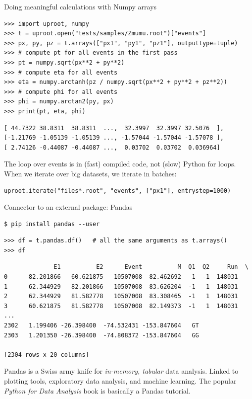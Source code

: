\documentclass[aspectratio=169]{beamer}
\begin{document}
\begin{frame}[fragile]{Doing meaningful calculations with Numpy arrays}
\small
\begin{verbatim}
>>> import uproot, numpy
>>> t = uproot.open("tests/samples/Zmumu.root")["events"]
>>> px, py, pz = t.arrays(["px1", "py1", "pz1"], outputtype=tuple)
>>> # compute pt for all events in the first pass
>>> pt = numpy.sqrt(px**2 + py**2)
>>> # compute eta for all events
>>> eta = numpy.arctanh(pz / numpy.sqrt(px**2 + py**2 + pz**2))
>>> # compute phi for all events
>>> phi = numpy.arctan2(py, px)
>>> print(pt, eta, phi)
\end{verbatim}
\begin{verbatim}
[ 44.7322 38.8311  38.8311  ...,  32.3997  32.3997 32.5076  ],
[-1.21769 -1.05139 -1.05139 ..., -1.57044 -1.57044 -1.57078 ],
[ 2.74126 -0.44087 -0.44087 ...,  0.03702  0.03702  0.036964]
\end{verbatim}

\normalsize
The loop over events is in (fast) compiled code, not (slow) Python for loops. When we iterate over big datasets, we iterate in batches:

\small
\begin{verbatim}
uproot.iterate("files*.root", "events", ["px1"], entrystep=1000)
\end{verbatim}
\end{frame}

\begin{frame}[fragile]{Connector to an external package: Pandas}
\vspace{0.1 cm}
\small
\begin{verbatim}
$ pip install pandas --user
\end{verbatim}
\begin{verbatim}
>>> df = t.pandas.df()   # all the same arguments as t.arrays()
>>> df
\end{verbatim}
\begin{verbatim}
              E1          E2      Event          M  Q1  Q2     Run  \
0      82.201866   60.621875   10507008  82.462692   1  -1  148031
1      62.344929   82.201866   10507008  83.626204  -1   1  148031
2      62.344929   81.582778   10507008  83.308465  -1   1  148031
3      60.621875   81.582778   10507008  82.149373  -1   1  148031
...
2302   1.199406 -26.398400  -74.532431 -153.847604   GT
2303   1.201350 -26.398400  -74.808372 -153.847604   GG

[2304 rows x 20 columns]
\end{verbatim}

\normalsize
Pandas is a Swiss army knife for {\it in-memory, tabular} data analysis. Linked to plotting tools, exploratory data analysis, and machine learning. The popular {\it Python for Data Analysis} book is basically a Pandas tutorial.
\end{frame}
\end{document}
